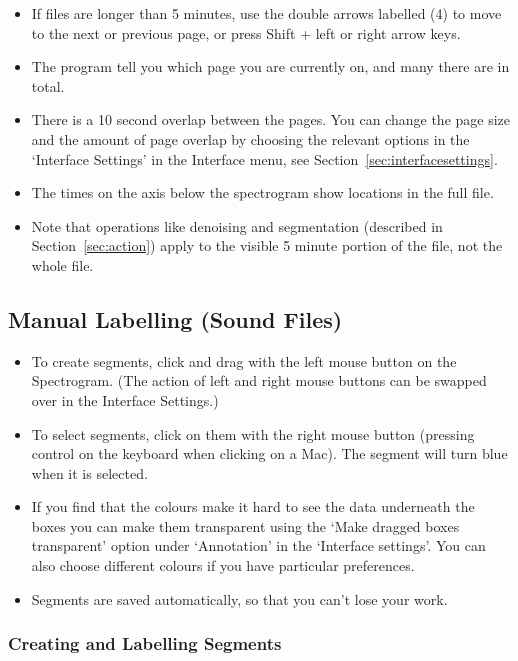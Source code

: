 \documentclass{article}
\begin{document}
\begin{itemize}
\item If files are longer than 5 minutes, use the double arrows labelled (4) to move to the next or previous page, or press Shift + left or right arrow keys. 
\item The program tell you which page you are currently on, and many there are in total. 
\item There is a 10 second overlap between the pages. You can change the page size and the amount of page overlap by choosing the relevant options in the `Interface Settings' in the Interface menu, see Section~\ref{sec:interfacesettings}. 
\item The times on the axis below the spectrogram show locations in the full file.
\item Note that operations like denoising and segmentation (described in Section~\ref{sec:action}) apply to the visible 5 minute portion of the file, not the whole file.
\end{itemize}

\subsection{Manual Labelling (Sound Files)}

\begin{itemize}
\item To create segments, click and drag with the left mouse button on the Spectrogram. (The action of left and right mouse buttons can be swapped over in the Interface Settings.)
\item To select segments, click on them with the right mouse button (pressing control on the keyboard when clicking on a Mac). The segment will turn blue when it is selected.
\item If you find that the colours make it hard to see the data underneath the boxes you can make them transparent using the `Make dragged boxes transparent' option under `Annotation' in the `Interface settings'. You can also choose different colours if you have particular preferences.
\item Segments are saved automatically, so that you can't lose your work.
\end{itemize}

\subsubsection*{Creating and Labelling Segments}
\end{document}
